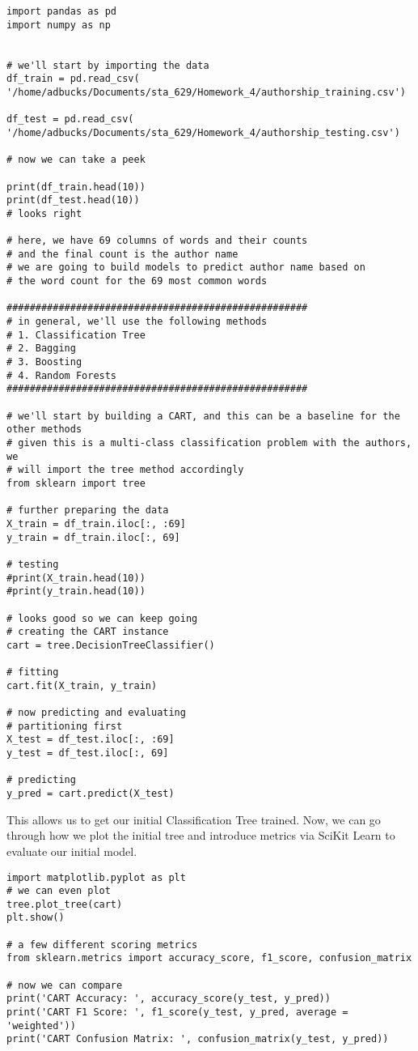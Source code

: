 \documentclass[12pt, letterpaper]{article}
\begin{document}
\begin{verbatim}
import pandas as pd 
import numpy as np 


# we'll start by importing the data 
df_train = pd.read_csv(
'/home/adbucks/Documents/sta_629/Homework_4/authorship_training.csv')

df_test = pd.read_csv(
'/home/adbucks/Documents/sta_629/Homework_4/authorship_testing.csv') 

# now we can take a peek 

print(df_train.head(10)) 
print(df_test.head(10))
# looks right 

# here, we have 69 columns of words and their counts 
# and the final count is the author name 
# we are going to build models to predict author name based on 
# the word count for the 69 most common words 

####################################################
# in general, we'll use the following methods 
# 1. Classification Tree 
# 2. Bagging 
# 3. Boosting 
# 4. Random Forests 
#################################################### 

# we'll start by building a CART, and this can be a baseline for the other methods  
# given this is a multi-class classification problem with the authors, we 
# will import the tree method accordingly 
from sklearn import tree 

# further preparing the data 
X_train = df_train.iloc[:, :69]
y_train = df_train.iloc[:, 69] 

# testing 
#print(X_train.head(10)) 
#print(y_train.head(10))

# looks good so we can keep going 
# creating the CART instance 
cart = tree.DecisionTreeClassifier() 

# fitting 
cart.fit(X_train, y_train) 

# now predicting and evaluating 
# partitioning first 
X_test = df_test.iloc[:, :69] 
y_test = df_test.iloc[:, 69]

# predicting 
y_pred = cart.predict(X_test) 
\end{verbatim}

This allows us to get our initial Classification Tree trained. Now, we can go through how we plot the initial tree and introduce metrics via SciKit Learn to evaluate our initial model. 

\begin{verbatim}
import matplotlib.pyplot as plt 
# we can even plot 
tree.plot_tree(cart)
plt.show() 

# a few different scoring metrics 
from sklearn.metrics import accuracy_score, f1_score, confusion_matrix 

# now we can compare 
print('CART Accuracy: ', accuracy_score(y_test, y_pred)) 
print('CART F1 Score: ', f1_score(y_test, y_pred, average = 'weighted')) 
print('CART Confusion Matrix: ', confusion_matrix(y_test, y_pred)) 
\end{verbatim}
\end{document}
